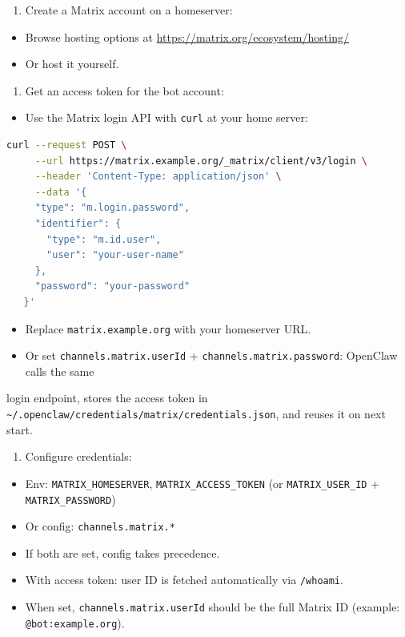 \begin{enumerate}
  \item Create a Matrix account on a homeserver:
\end{enumerate}

\begin{itemize}
  \item Browse hosting options at \href{https://matrix.org/ecosystem/hosting/}{https://matrix.org/ecosystem/hosting/}
  \item Or host it yourself.
\end{itemize}

\begin{enumerate}
  \item Get an access token for the bot account:
\end{enumerate}

\begin{itemize}
  \item Use the Matrix login API with \texttt{curl} at your home server:
\end{itemize}


\begin{lstlisting}[language=bash]
   curl --request POST \
     --url https://matrix.example.org/_matrix/client/v3/login \
     --header 'Content-Type: application/json' \
     --data '{
     "type": "m.login.password",
     "identifier": {
       "type": "m.id.user",
       "user": "your-user-name"
     },
     "password": "your-password"
   }'
\end{lstlisting}


\begin{itemize}
  \item Replace \texttt{matrix.example.org} with your homeserver URL.
  \item Or set \texttt{channels.matrix.userId} + \texttt{channels.matrix.password}: OpenClaw calls the same
\end{itemize}

login endpoint, stores the access token in \texttt{\textasciitilde{}/.openclaw/credentials/matrix/credentials.json},
and reuses it on next start.

\begin{enumerate}
  \item Configure credentials:
\end{enumerate}

\begin{itemize}
  \item Env: \texttt{MATRIX\_HOMESERVER}, \texttt{MATRIX\_ACCESS\_TOKEN} (or \texttt{MATRIX\_USER\_ID} + \texttt{MATRIX\_PASSWORD})
  \item Or config: \texttt{channels.matrix.*}
  \item If both are set, config takes precedence.
  \item With access token: user ID is fetched automatically via \texttt{/whoami}.
  \item When set, \texttt{channels.matrix.userId} should be the full Matrix ID (example: \texttt{@bot:example.org}).
\end{itemize}

